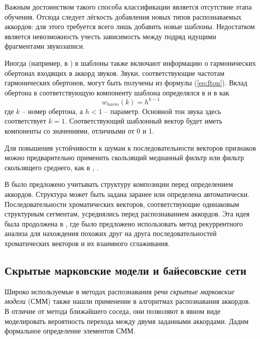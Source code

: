 Важным достоинством такого способа классификации является отсутствие этапа
обучения. Отсюда следует лёгкость добавления новых типов распознаваемых
аккордов: для этого требуется всего лишь добавить новые шаблоны. Недостатком
является невозможность учесть зависимость между подряд идущими фрагментами
звукозаписи.

Иногда (например, в \cite{Oudre2009}) в шаблоны также включают информацию о
гармонических обертонах входящих в аккорд звуков. Звуки, соответствующие
частотам гармонических обертонов, могут быть получены из формулы
(\ref{eq:fton}). Вклад обертона в соответствующую компоненту шаблона
определялся в \cite{Gomez2006} и в \cite{Oudre2009} как
\begin{equation} \label{eq:templates_harmonics}
w_{harm}(k) = h^{k-1}
\end{equation}
где $k$ -- номер обертона, а $h < 1$ -- параметр. Основной тон звука здесь
соответствует $k=1$. Соответствующий шаблонный вектор будет иметь компоненты со
значениями, отличными от 0 и 1.

Для повышения устойчивости к шумам к последовательности векторов признаков
можно предварительно применить скользящий медианный фильтр или фильтр
скользящего среднего, как в \cite{Lee2006}, \cite{Oudre2009}. 

В \cite{Mauch2009} было предложено учитывать структуру композиции перед
определением аккордов. Структура может быть задана заранее или определена
автоматически. Последовательности хроматических векторов, соответствующие
одинаковым структурным сегментам, усреднялись перед распознаванием аккордов. Эта
идея была продолжена в \cite{Cho2011}, где было предложено использовать метод
рекуррентного анализа для нахождения похожих друг на друга последовательностей
хроматических векторов и их взаимного сглаживания.

\subsection{Скрытые марковские модели и байесовские сети}

Широко используемые в методах распознавания речи \emph{скрытые марковские
модели} (СММ) \cite{Rabiner1989} также нашли применение в алгоритмах
распознавания аккордов. В отличие от метода ближайшего соседа, они позволяют в
явном виде моделировать вероятность перехода между двумя заданными аккордами.
Дадим формальное определение элементов СММ.

